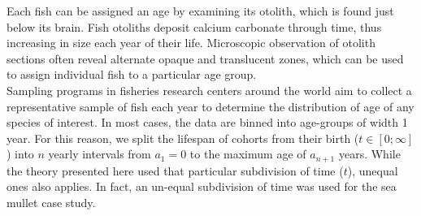Each fish can be assigned an age by examining its otolith, which is found just below its brain. Fish otoliths deposit calcium carbonate through time, thus increasing in size each year of their life. Microscopic observation of otolith sections often reveal alternate opaque and translucent zones, which can be used to assign individual fish to a particular age group. \\ 

Sampling programs in fisheries research centers around the world aim to collect a representative sample of fish each year to determine the distribution of age of any species of interest. In most cases, the data are binned into age-groups of width 1 year. For this reason, we split the lifespan of cohorts from their birth ($t \in [0;\infty]$) into $n$ yearly intervals from $a_{1}=0$ to the maximum age of $a_{n+1}$ years. While the theory presented here used that particular subdivision of time ($t$), unequal ones also applies. In fact, an un-equal subdivision of time was used for the sea mullet case study.
 
